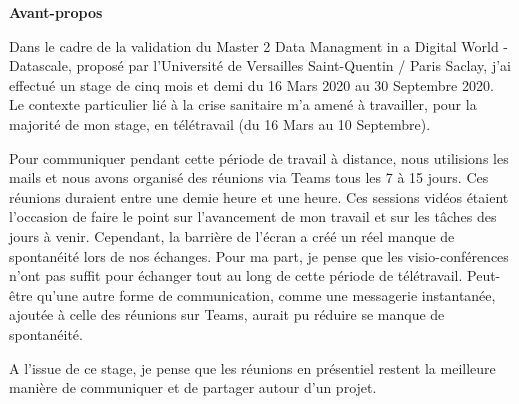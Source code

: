 \documentclass[11pt]{article}
\begin{document}
\newpage
\begin{center}
	\textbf{Avant-propos}
\end{center}
\hspace*{0.4cm}
Dans le cadre de la validation du Master 2 Data Managment in a Digital World - Datascale, proposé par l'Université de Versailles Saint-Quentin / Paris Saclay, j'ai effectué un stage de cinq mois et demi du 16 Mars 2020 au 30 Septembre 2020.
Le contexte particulier lié à la crise sanitaire m'a amené à travailler, pour la majorité de mon stage, en télétravail (du 16 Mars au 10 Septembre).\par
Pour communiquer pendant cette période de travail à distance, nous utilisions les mails et nous avons organisé des réunions via Teams tous les 7 à 15 jours.
Ces réunions duraient entre une demie heure et une heure.
Ces sessions vidéos étaient l'occasion de faire le point sur l'avancement de mon travail et sur les tâches des jours à venir.
Cependant, la barrière de l'écran a créé un réel manque de spontanéité lors de nos échanges.
Pour ma part, je pense que les visio-conférences n'ont pas suffit pour échanger tout au long de cette période de télétravail. 
Peut-être qu'une autre forme de communication, comme une messagerie instantanée, ajoutée à celle des réunions sur Teams, aurait pu réduire se manque de spontanéité.\par
A l'issue de ce stage, je pense que les réunions en présentiel restent la meilleure manière de communiquer et de partager autour d'un projet.

\newpage
\renewcommand{\contentsname}{Table des matières}\tableofcontents

\newpage
\end{document}
